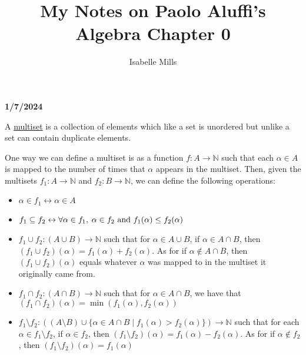 \documentclass{book}
\title{My Notes on Paolo Aluffi's Algebra Chapter 0}
\author{Isabelle Mills}
\newcommand{\hOne}{%
   \color{Black}%
   \fontsize{14}{14}\selectfont%
}
\newcommand{\hTwo}{%
   \color{MidnightBlue}%
   \fontsize{13}{13}%
}
\newcommand{\hThree}{%
   \color{PineGreen}
   \fontsize{13}{13}
}
\newenvironment{myIndent}{%
   \begin{adjustwidth}{2.5em}{0em}%
}{%
   \end{adjustwidth}%
}
\newcommand{\udefine}[1]{%
   \setulcolor{Red}%
   \setul{0.1ex}{0.15ex}%
   \ul{#1}%
}
\newcommand*{\markDate}[1]{
   {\huge \color{Black} \textbf{#1} \newline}
}
\begin{document}
   \maketitle{}

   \markDate{1/7/2024}

   \hOne
   A \udefine{multiset} is a collection of elements 
   which like a set is unordered but unlike a set can
   contain duplicate elements.
   
   \begin{myIndent}
      \hTwo
      One way we can define a multiset is as a function
      \( f: A\rightarrow\mathbb{N} \) such that each
      \(\alpha \in A \) is mapped to the number of times that 
      \(\alpha\) appears in the multiset. Then, given the multisets 
      \(f_{1}: A\rightarrow \mathbb{N}\) and \(f_{2}: 
      B \rightarrow \mathbb{N}\), we can define the following
      operations:

      \hThree
      \begin{itemize}
         \item \(\alpha \in f_{1} \leftrightarrow \alpha \in A\)

         \item \(f_{1} \subseteq f_{2} \leftrightarrow 
               \forall \alpha \in f_{1}, \hspace{0.25em} \alpha \in f_{2} 
               \text{ and } f_{1}(\alpha) \leq f_{2}(\alpha)\)

         \item \(f_{1} \cup f_{2}: (A \cup B) \rightarrow
               \mathbb{N} \) such that for \(\alpha
               \in A \cup B\), if \(\alpha \in A \cap B \),
               then \((f_{1} \cup f_{2})(\alpha) = f_{1}(\alpha)
               + f_{2}(\alpha)\). As for if \(\alpha \notin 
               A \cap B \), then \((f_{1} \cup f_{2})(\alpha)\)
               equals whatever $\alpha$ was mapped to 
               in the multiset it originally came from.
         
         \item \(f_{1} \cap f_{2}: (A \cap B) \rightarrow
               \mathbb{N} \) such that for \(\alpha
               \in A \cap B\), we have that\\
               \((f_{1} \cap f_{2})(\alpha) = \min(f_{1}(\alpha)
               , f_{2}(\alpha))\)
         
         \item \(f_{1} \setminus f_{2}: ((A \setminus B)
               \cup \{\alpha \in A \cap B \mid f_{1}(\alpha) >
               f_{2}(\alpha)\}) \rightarrow \mathbb{N} \) 
               such that for each \(\alpha \in f_{1} \setminus f_{2}\), 
               if \(\alpha \in f_{2} \), then \((f_{1} \setminus f_{2})(\alpha) 
               = f_{1}(\alpha) - f_{2}(\alpha)\). As for if \(\alpha 
               \notin f_{2} \), then \((f_{1} \setminus f_{2})(\alpha) = 
               f_{1}(\alpha)\)
         

\end{itemize}
\end{myIndent}
\end{document}
